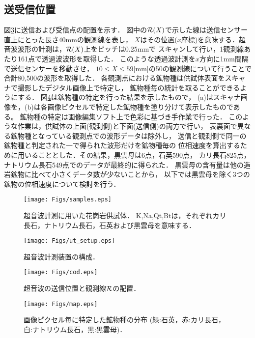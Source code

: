 \subsection{送受信位置}
図\ref{fig:fig3}に送信および受信点の配置を示す．
図中の${\cal R}(X)$で示した線は送信センサー直上にとった長さ40mmの観測線を表し，
$X$はその位置($x$座標)を意味する．超音波波形の計測は，${\cal R}(X)$上をピッチは0.25mmで
スキャンして行い，1観測線あたり161点で透過波波形を取得した．
このような透過波計測を$x$方向に1mm間隔で送信センサーを移動させ，
$10\leq X \leq 59$[mm]の50の観測線について行うことで合計80,500の波形を取得した．
各観測点における鉱物種は供試体表面をスキャナで撮影したデジタル画像上で特定し，
鉱物種毎の統計を取ることができるようにする．
図\ref{fig:fig4}は鉱物種の特定を行った結果を示したもので，
(a)はスキャナ画像を，(b)は各画像ピクセルで特定した鉱物種を塗り分けて表示したものである。
鉱物種の特定は画像編集ソフト上で色彩に基づき手作業で行った．
このような作業は，供試体の上面(観測側)と下面(送信側)の両方で行い，
表裏面で異なる鉱物種となっている観測点での波形データは除外し，
送信と観測側で同一の鉱物種と判定された一で得られた波形だけを鉱物種毎の
位相速度を算出するために用いることとした．その結果，黒雲母は6点，石英590点，
カリ長石825点，ナトリウム長石549点でのデータが最終的に得られた．
黒雲母の含有量は他の造岩鉱物に比べて小さくデータ数が少ないことから，
以下では黒雲母を除く3つの鉱物の位相速度について検討を行う．
\begin{figure}
\begin{center}
\texttt{[image: Figs/samples.eps]}
\caption{
	超音波計測に用いた花崗岩供試体．
	K,Na,Qt,Btは，それぞれカリ長石，ナトリウム長石，石英および黒雲母を意味する．
}
\label{fig:fig1}
\end{center}
	\vspace{-5mm}
\end{figure}
\begin{figure}[t]
\begin{center}
\texttt{[image: Figs/ut\_setup.eps]}
\caption{ 超音波計測装置の構成． }
\label{fig:fig2}
\end{center}
\end{figure}
\begin{figure}[t]
\begin{center}
\texttt{[image: Figs/cod.eps]}
\caption{
	超音波の送信位置と観測線$\cal R$の配置．
}
\label{fig:fig3}
\end{center}
\end{figure}
\begin{figure}[t]
\begin{center}
\texttt{[image: Figs/map.eps]}
\caption{
	画像ピクセル毎に特定した鉱物種の分布
	(緑:石英，赤:カリ長石，白:ナトリウム長石，黒:黒雲母)．
}
\label{fig:fig4}
\end{center}
\end{figure}

